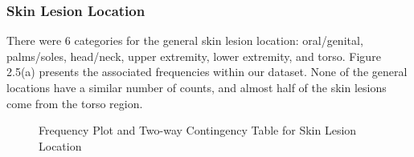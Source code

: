\documentclass [MAS] {uclathes}
\begin{document}
\subsubsection*{Skin Lesion Location}

There were 6 categories for the general skin lesion location: oral/genital, palms/soles, head/neck, upper extremity, lower extremity, and torso. Figure 2.5(a) presents the associated frequencies within our dataset. None of the general locations have a similar number of counts, and almost half of the skin lesions come from the torso region.

\begin{figure}[hbt!]
    \hspace*{\fill}
    \centering
    \hspace{1em}
    \hspace*{\fill}
    \label{fig:loc_eda_tab}
    \vspace{0cm}
    \caption{Frequency Plot and Two-way Contingency Table for Skin Lesion Location}
    \end{figure} 
\end{document}
